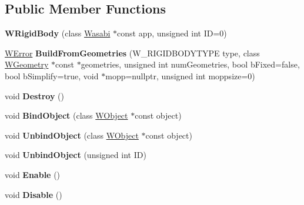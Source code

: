 \subsection*{Public Member Functions}
\begin{DoxyCompactItemize}
\item 
{\bfseries W\+Rigid\+Body} (class \hyperlink{class_wasabi}{Wasabi} $\ast$const app, unsigned int ID=0)\hypertarget{class_w_rigid_body_ad9fd0ffdd357be29048efd0937c65254}{}\label{class_w_rigid_body_ad9fd0ffdd357be29048efd0937c65254}

\item 
\hyperlink{class_w_error}{W\+Error} {\bfseries Build\+From\+Geometries} (W\+\_\+\+R\+I\+G\+I\+D\+B\+O\+D\+Y\+T\+Y\+PE type, class \hyperlink{class_w_geometry}{W\+Geometry} $\ast$const $\ast$geometries, unsigned int num\+Geometries, bool b\+Fixed=false, bool b\+Simplify=true, void $\ast$mopp=nullptr, unsigned int moppsize=0)\hypertarget{class_w_rigid_body_a26ec9548b70eae38000cbd46433436e8}{}\label{class_w_rigid_body_a26ec9548b70eae38000cbd46433436e8}

\item 
void {\bfseries Destroy} ()\hypertarget{class_w_rigid_body_a3f5bb1770cd9df627e66c30cba9f85b1}{}\label{class_w_rigid_body_a3f5bb1770cd9df627e66c30cba9f85b1}

\item 
void {\bfseries Bind\+Object} (class \hyperlink{class_w_object}{W\+Object} $\ast$const object)\hypertarget{class_w_rigid_body_a9ed6688fadeb0538db49882a970a395a}{}\label{class_w_rigid_body_a9ed6688fadeb0538db49882a970a395a}

\item 
void {\bfseries Unbind\+Object} (class \hyperlink{class_w_object}{W\+Object} $\ast$const object)\hypertarget{class_w_rigid_body_a51018196521bc094d583a570020b3c36}{}\label{class_w_rigid_body_a51018196521bc094d583a570020b3c36}

\item 
void {\bfseries Unbind\+Object} (unsigned int ID)\hypertarget{class_w_rigid_body_a44fe578cf70ffe73a98efa488ca24b54}{}\label{class_w_rigid_body_a44fe578cf70ffe73a98efa488ca24b54}

\item 
void {\bfseries Enable} ()\hypertarget{class_w_rigid_body_a9a947480d513aa261650773394a5d179}{}\label{class_w_rigid_body_a9a947480d513aa261650773394a5d179}

\item 
void {\bfseries Disable} ()\hypertarget{class_w_rigid_body_aeea79e57a067aa62c4f4d8a8ca1c88fb}{}\label{class_w_rigid_body_aeea79e57a067aa62c4f4d8a8ca1c88fb}


\end{DoxyCompactItemize}
